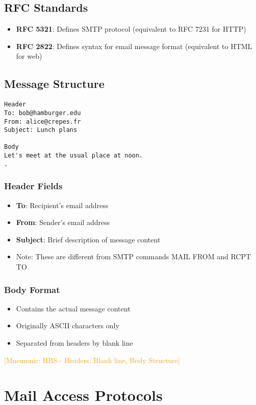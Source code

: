 \documentclass[12pt]{article}
\begin{document}
\subsection{RFC Standards}
\begin{itemize}
    \item \textbf{RFC 5321}: Defines SMTP protocol (equivalent to RFC 7231 for HTTP)
    \item \textbf{RFC 2822}: Defines syntax for email message format (equivalent to HTML for web)
\end{itemize}

\subsection{Message Structure}
\begin{verbatim}
Header
To: bob@hamburger.edu
From: alice@crepes.fr
Subject: Lunch plans

Body
Let's meet at the usual place at noon.
.
\end{verbatim}

\subsubsection{Header Fields}
\begin{itemize}
    \item \textbf{To}: Recipient's email address
    \item \textbf{From}: Sender's email address
    \item \textbf{Subject}: Brief description of message content
    \item Note: These are different from SMTP commands MAIL FROM and RCPT TO
\end{itemize}

\subsubsection{Body Format}
\begin{itemize}
    \item Contains the actual message content
    \item Originally ASCII characters only
    \item Separated from headers by blank line
\end{itemize}

\textcolor{orange}{[Mnemonic: HBS - Headers, Blank line, Body Structure]}

\section{Mail Access Protocols}
\end{document}
